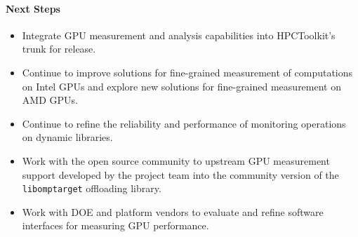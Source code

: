 \paragraph{Next Steps}
\begin{itemize}

\item 
Integrate GPU measurement and analysis capabilities into HPCToolkit's trunk for
release.

\item 
Continue to improve solutions for fine-grained measurement of computations on Intel GPUs and explore new solutions for fine-grained measurement on AMD GPUs.

\item 
Continue to refine the reliability and performance of monitoring operations on dynamic libraries.

\item 
Work with the open source community to upstream GPU measurement support
developed by the project team into the community version of the {\tt
libomptarget} offloading library.

\item 
Work with DOE and platform vendors to evaluate and refine software interfaces for measuring GPU performance.

\end{itemize}
